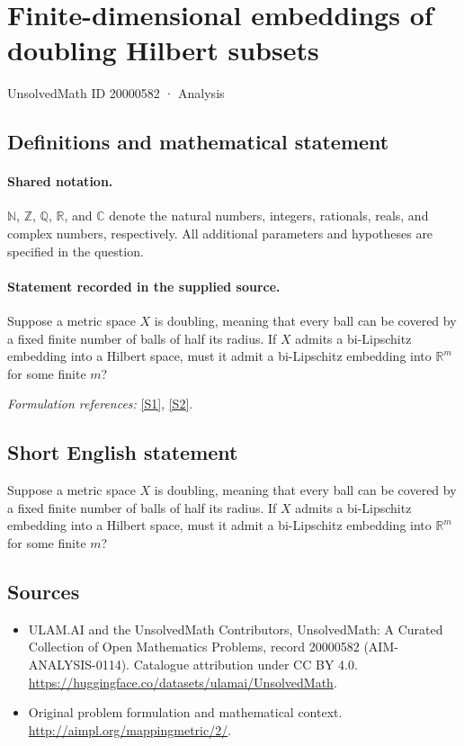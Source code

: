 \documentclass[11pt]{article}
\newcommand{\sref}[2]{\hyperlink{source:#1:#2}{[S#2]}}
\begin{document}
\setcounter{section}{20000581}
\section{Finite-dimensional embeddings of doubling Hilbert subsets}\label{20000582}
{\small UnsolvedMath ID 20000582 · Analysis}
\subsection{Definitions and mathematical statement}

\paragraph{Shared notation.}$\mathbb N$, $\mathbb Z$, $\mathbb Q$, $\mathbb R$, and $\mathbb C$ denote the natural numbers, integers, rationals, reals, and complex numbers, respectively. All additional parameters and hypotheses are specified in the question.


\paragraph{Statement recorded in the supplied source.}
Suppose a metric space $X$ is doubling, meaning that every ball can be covered by a fixed finite number of balls of half its radius. If $X$ admits a bi-Lipschitz embedding into a Hilbert space, must it admit a bi-Lipschitz embedding into $\mathbb R^m$ for some finite $m$?
\par\smallskip\textit{Formulation references:} \sref{20000582}{1}, \sref{20000582}{2}.
\subsection{Short English statement}
Suppose a metric space $X$ is doubling, meaning that every ball can be covered by a fixed finite number of balls of half its radius. If $X$ admits a bi-Lipschitz embedding into a Hilbert space, must it admit a bi-Lipschitz embedding into $\mathbb R^m$ for some finite $m$?
\subsection{Sources}
\begin{itemize}
\item[\hypertarget{source:20000582:1}{S1}] ULAM.AI and the UnsolvedMath Contributors, UnsolvedMath: A Curated Collection of Open Mathematics Problems, record 20000582 (AIM-ANALYSIS-0114). Catalogue attribution under CC BY 4.0.
\url{https://huggingface.co/datasets/ulamai/UnsolvedMath}.
\item[\hypertarget{source:20000582:2}{S2}] Original problem formulation and mathematical context.
\url{http://aimpl.org/mappingmetric/2/}.
\end{itemize}
\label{end:20000582}
\end{document}
